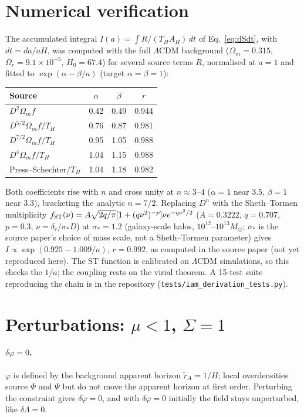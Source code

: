 \section{Numerical verification}\label{sec:numerics}
The accumulated integral $I(a)=\int R/(T_HA_H)\,dt$ of Eq.~\eqref{eq:dSdt}, with $dt=da/aH$, was computed with the full $\Lambda$CDM background ($\Omega_m=0.315$,
$\Omega_r=9.1\times10^{-5}$, $H_0=67.4$) for several source terms $R$, normalised at $a=1$ and fitted to $\exp(\alpha-\beta/a)$ (target $\alpha=\beta=1$):
\begin{center}\small\begin{tabular}{lccc}\hline Source & $\alpha$ & $\beta$ & $r$\\\hline
$D^2\Omega_mf$ & 0.42 & 0.49 & 0.944\\ $D^{5/2}\Omega_mf/T_H$ & 0.76 & 0.87 & 0.981\\ $D^{7/2}\Omega_mf/T_H$ & 0.95 & 1.05 & 0.988\\
$D^{4}\Omega_mf/T_H$ & 1.04 & 1.15 & 0.988\\ Press--Schechter$/T_H$ & 1.04 & 1.18 & 0.982\\\hline\end{tabular}\end{center}
Both coefficients rise with $n$ and cross unity at $n\approx3$--$4$ ($\alpha=1$ near 3.5, $\beta=1$ near 3.3), bracketing the analytic $n=7/2$. Replacing $D^n$ with the Sheth--Tormen
multiplicity $f_{\rm ST}(\nu)=A\sqrt{2q/\pi}[1+(q\nu^2)^{-p}]\nu e^{-q\nu^2/2}$ ($A=0.3222$, $q=0.707$, $p=0.3$, $\nu=\delta_c/\sigma_*D$) at $\sigma_*=1.2$
(galaxy-scale halos, $10^{12}$--$10^{13}M_\odot$; $\sigma_*$ is the source paper's choice of mass scale, not a Sheth--Tormen parameter) gives
$I\propto\exp(0.925-1.009/a)$, $r=0.992$, as computed in the source paper (not yet reproduced here). The ST function is calibrated on $\Lambda$CDM simulations,
so this checks the $1/a$; the coupling rests on the virial theorem. A 15-test suite reproducing the chain is in the repository
(\texttt{tests/iam\_derivation\_tests.py}).

\section{Perturbations: $\mu<1$, $\Sigma=1$}
\paragraph{$\delta\varphi=0$.} $\varphi$ is defined by the background apparent horizon $\tilde r_A=1/H$; local overdensities source $\Phi$ and $\Psi$ but do not
move the apparent horizon at first order. Perturbing the constraint gives $\delta\dot\varphi=0$, and with $\delta\varphi=0$ initially the field stays
unperturbed, like $\delta\Lambda=0$.

